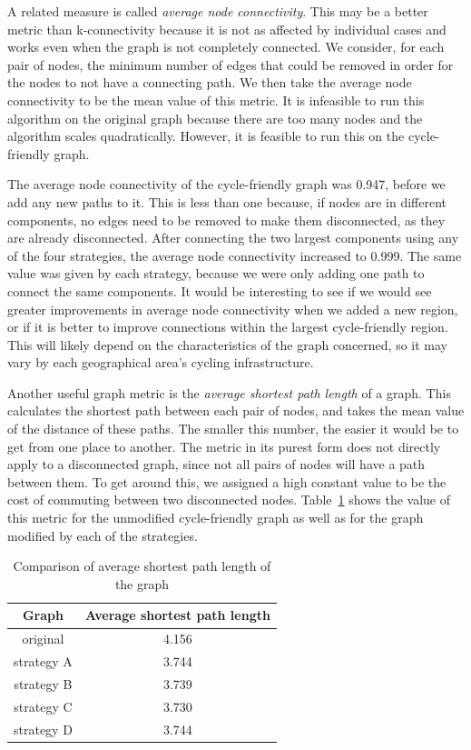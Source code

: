 \documentclass[12pt,a4paper]{report}
\begin{document}
A related measure is called \textit{average node connectivity}. This may be a better metric than k-connectivity because it is not as affected by individual cases and works even when the graph is not completely connected. We consider, for each pair of nodes, the minimum number of edges that could be removed in order for the nodes to not have a connecting path. We then take the average node connectivity to be the mean value of this metric. It is infeasible to run this algorithm on the original graph because there are too many nodes and the algorithm scales quadratically. However, it is feasible to run this on the cycle-friendly graph.

The average node connectivity of the cycle-friendly graph was 0.947, before we add any new paths to it. This is less than one because, if nodes are in different components, no edges need to be removed to make them disconnected, as they are already disconnected. After connecting the two largest components using any of the four strategies, the average node connectivity increased to 0.999. The same value was given by each strategy, because we were only adding one path to connect the same components. It would be interesting to see if we would see greater improvements in average node connectivity when we added a new region, or if it is better to improve connections within the largest cycle-friendly region. This will likely depend on the characteristics of the graph concerned, so it may vary by each geographical area's cycling infrastructure.

Another useful graph metric is the \textit{average shortest path length} of a graph. This calculates the shortest path between each pair of nodes, and takes the mean value of the distance of these paths. The smaller this number, the easier it would be to get from one place to another. The metric in its purest form does not directly apply to a disconnected graph, since not all pairs of nodes will have a path between them. To get around this, we assigned a high constant value to be the cost of commuting between two disconnected nodes. Table~\ref{tab:avg path} shows the value of this metric for the unmodified cycle-friendly graph as well as for the graph modified by each of the strategies.

\begin{table}[ht]
    \centering
    \begin{tabular}{|c|c|}
        \hline
        Graph & Average shortest path length \\
        \hline
        original & 4.156 \\
        strategy A & 3.744 \\
        strategy B & 3.739 \\
        strategy C & 3.730 \\
        strategy D & 3.744 \\
        \hline
    \end{tabular}
    \caption{Comparison of average shortest path length of the graph}
    \label{tab:avg path}
\end{table}
\end{document}
